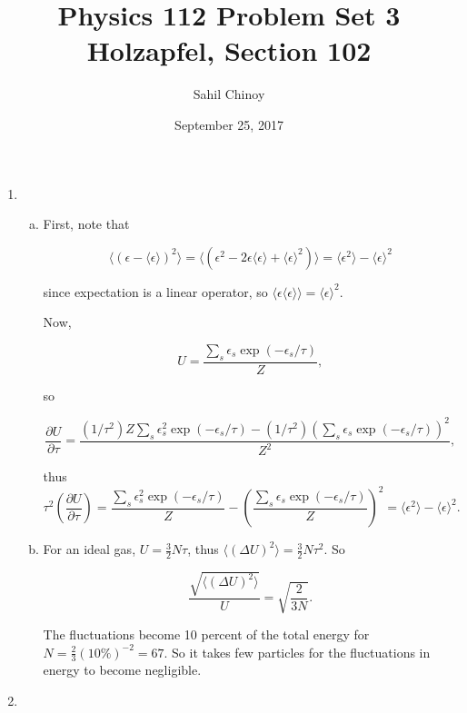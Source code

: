 \documentclass{article}
\title{Physics 112 Problem Set 3 \\ \large{Holzapfel, Section 102}}
\author{Sahil Chinoy}
\date{September 25, 2017}
\begin{document}
\maketitle{}

\begin{enumerate}

	\item 

	\begin{enumerate}[(a)]

		\item

		First, note that

		$$\langle (\epsilon - \langle \epsilon \rangle )^2 \rangle = \langle (\epsilon^2 - 2 \epsilon \langle \epsilon \rangle + \langle \epsilon \rangle ^2 ) \rangle = \langle \epsilon^2 \rangle - \langle \epsilon \rangle ^2$$

		since expectation is a linear operator, so $\langle \epsilon \langle \epsilon \rangle \rangle = \langle \epsilon \rangle ^2.$

		Now,

		$$U = \frac{ \sum_s \epsilon_s \exp(-\epsilon_s / \tau) }{Z},$$

		so

		$$\frac{\partial U}{\partial \tau} = \frac{(1 / \tau^2) Z \sum_s \epsilon_s^2 \exp(-\epsilon_s / \tau) - (1 / \tau^2 ) \left(\sum_s \epsilon_s \exp(-\epsilon_s / \tau) \right)^2}{Z^2},$$

		thus $$\tau^2 \left(\frac{\partial U}{\partial \tau} \right) = \frac{\sum_s \epsilon_s^2 \exp(-\epsilon_s / \tau)}{Z} - \left( \frac{\sum_s \epsilon_s \exp(-\epsilon_s / \tau)}{Z} \right)^2 = \langle \epsilon^2 \rangle - \langle \epsilon \rangle ^2.$$

		\item 

		For an ideal gas, $U = \frac{3}{2} N \tau$, thus $\langle (\Delta U)^2 \rangle = \frac{3}{2} N \tau^2$. So

		$$\frac{\sqrt{\langle (\Delta U)^2 \rangle}}{U} = \sqrt{\frac{2}{3N}}.$$

		The fluctuations become 10 percent of the total energy for $N = \frac{2}{3} (10 \%)^{-2} = 67.$ So it takes few particles for the fluctuations in energy to become negligible.

	\end{enumerate}

	\item 

	\begin{enumerate}[(a)]


\end{enumerate}
\end{enumerate}
\end{document}
